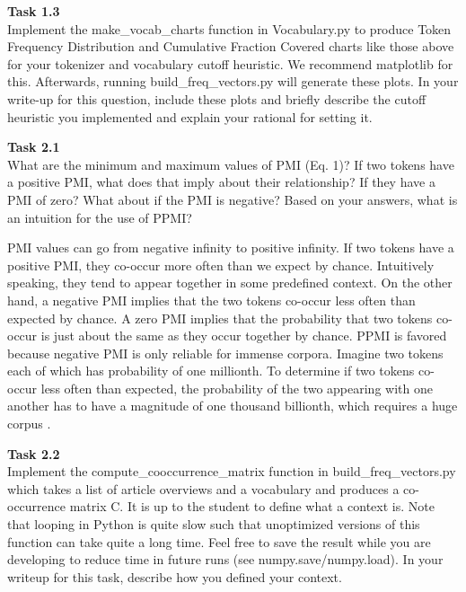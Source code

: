 \documentclass[12pt,article]{article}
\newenvironment{task}[2][Task]
    { \begin{mdframed}[backgroundcolor=gray!20] \textbf{#1 #2} \\}
    {  \end{mdframed}}
\begin{document}
\begin{task}{1.3} 
Implement the make\_vocab\_charts function in Vocabulary.py to produce Token Frequency Distribution and Cumulative Fraction Covered charts like those above for your tokenizer and vocabulary cutoff heuristic. We recommend matplotlib for this. Afterwards, running build\_freq\_vectors.py will generate these plots. In your write-up for this question, include these plots and briefly describe the cutoff heuristic you implemented and explain your rational for setting it.
\end{task}

\newpage
\begin{task}{2.1}
What are the minimum and maximum values of PMI (Eq. 1)? If two tokens have a positive PMI, what does that imply about their relationship? If they have a PMI of zero? What about if the PMI is negative? Based on your answers, what is an intuition for the use of PPMI?
\end{task}

PMI values can go from negative infinity to positive infinity. If two tokens have a positive PMI, they co-occur more often than we expect by chance. Intuitively speaking, they tend to appear together in some predefined context. On the other hand, a negative PMI implies that the two tokens co-occur less often than expected by chance. A zero PMI implies that the probability that two tokens co-occur is just about the same as they occur together by chance. PPMI is favored because negative PMI is only reliable for immense corpora. Imagine two tokens each of which has probability of one millionth. To determine if two tokens co-occur less often than expected, the probability of the two appearing with one another has to have a magnitude of one thousand billionth, which requires a huge corpus \cite{JurafskyMartin08}.

\begin{task}{2.2}
Implement the compute\_cooccurrence\_matrix function in build\_freq\_vectors.py which takes a list of article overviews and a vocabulary and produces a co-occurrence matrix C. It is up to the student to define what a context is. Note that looping in Python is quite slow such that unoptimized versions of this function can take quite a long time. Feel free to save the result while you are developing to reduce time in future runs (see numpy.save/numpy.load). In your writeup for this task, describe how you defined your context.
\end{task}
\end{document}
